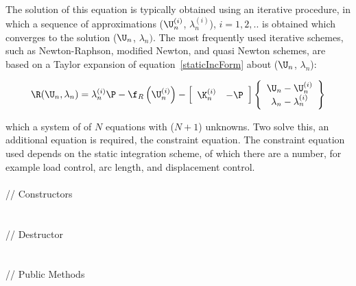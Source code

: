 The solution of this equation is typically obtained using an iterative
procedure, in which a sequence of approximations
($\U_{n}^{(i)}$, $\lambda_n^{(i)}$), $i=1,2, ..$ is obtained which
converges to the solution ($\U_n$, $\lambda_n)$. The most
frequently used iterative schemes, such as Newton-Raphson, modified
Newton, and quasi Newton schemes, are based on a Taylor expansion of
equation~\ref{staticIncForm} about ($\U_{n}$, $\lambda_n$):     

\begin{equation} 
\R(\U_{n},\lambda_n) = \lambda_n^{(i)} \P 
 - \f_{R}\left(\U_{n}^{(i)} \right) - \left[
\begin{array}{cc}
\K_n^{(i)} & -\P \\
\end{array} \right] 
\left\{
\begin{array}{c}
\U_{n} - \U_{n}^{(i)}  \\ 
\lambda_n - \lambda_n^{(i)} 
\end{array} \right\}
\label{staticFormTaylor}
\end{equation} 

\noindent which  a system of of $N$ equations with ($N+1$)
unknowns. Two solve this, an additional equation is required, the
constraint equation. The constraint equation used depends on the
static integration scheme, of which there are a number, for example
load control, arc length, and displacement control. \\

\pagebreak
{} \\
\indent\indent // Constructors \\
\indent{}\\  \\
\indent\indent // Destructor \\
\indent{}\\  \\
\indent\indent // Public Methods \\
\indent{} \\
\indent{} \\
\indent{} \\
\indent{} \\
\indent{} \\

